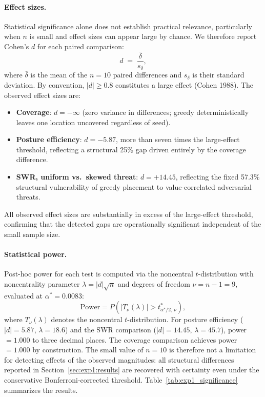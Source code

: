 \documentclass[11pt]{article}
\begin{document}
\paragraph{Effect sizes.}
Statistical significance alone does not establish practical relevance,
particularly when $n$ is small and effect sizes can appear large by
chance. We therefore report Cohen's $d$ for each paired comparison:
\begin{equation}
    d \;=\; \frac{\bar{\delta}}{s_\delta},
    \label{eq:cohens_d}
\end{equation}
where $\bar{\delta}$ is the mean of the $n = 10$ paired differences and
$s_\delta$ is their standard deviation. By convention, $|d| \geq 0.8$
constitutes a large effect (Cohen 1988). The observed effect sizes
are:
\begin{itemize}
    \item \textbf{Coverage}: $d = -\infty$ (zero variance in differences;
          greedy deterministically leaves one location uncovered regardless
          of seed).
    \item \textbf{Posture efficiency}: $d = -5.87$, more than seven times
          the large-effect threshold, reflecting a structural 25\% gap
          driven entirely by the coverage difference.
    \item \textbf{SWR, uniform vs.\ skewed threat}: $d = +14.45$,
          reflecting the fixed 57.3\% structural vulnerability of
          greedy placement to value-correlated adversarial threats.
\end{itemize}
All observed effect sizes are substantially in excess of the
large-effect threshold, confirming that the detected gaps are
operationally significant independent of the small sample size.

\paragraph{Statistical power.}
Post-hoc power for each test is computed via the noncentral
$t$-distribution with noncentrality parameter
$\lambda = |d|\sqrt{n}$ and degrees of freedom $\nu = n - 1 = 9$,
evaluated at $\alpha^* = 0.0083$:
\begin{equation}
    \mathrm{Power} = P\!\left(|T_\nu(\lambda)| > t^*_{\alpha^*/2,\,\nu}\right),
    \label{eq:power}
\end{equation}
where $T_\nu(\lambda)$ denotes the noncentral $t$-distribution.
For posture efficiency ($|d| = 5.87$, $\lambda = 18.6$) and the SWR
comparison ($|d| = 14.45$, $\lambda = 45.7$), power $= 1.000$ to
three decimal places. The coverage comparison achieves power $= 1.000$
by construction. The small value of $n = 10$ is therefore not a
limitation for detecting effects of the observed magnitudes: all
structural differences reported in Section~\ref{sec:exp1:results}
are recovered with certainty even under the conservative
Bonferroni-corrected threshold.
Table~\ref{tab:exp1_significance} summarizes the results.
\end{document}
